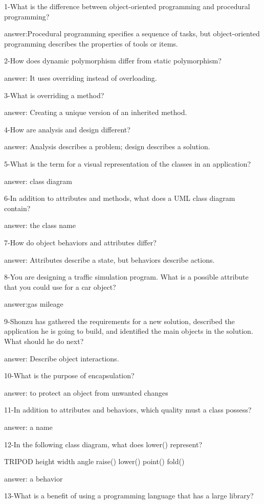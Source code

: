 1-What is the difference between object-oriented programming and procedural programming?


answer:Procedural programming specifies a sequence of tasks, but object-oriented programming describes the properties of tools or items.
 
2-How does dynamic polymorphism differ from static polymorphism?


answer: It uses overriding instead of overloading.

3-What is overriding a method?


answer: Creating a unique version of an inherited method.

4-How are analysis and design different?


answer: Analysis describes a problem; design describes a solution.

5-What is the term for a visual representation of the classes in an application?


answer: class diagram

6-In addition to attributes and methods, what does a UML class diagram contain?


answer: the class name

7-How do object behaviors and attributes differ?


answer: Attributes describe a state, but behaviors describe actions.

8-You are designing a traffic simulation program. What is a possible attribute that you could use for a car object?


answer:gas mileage

9-Shonzu has gathered the requirements for a new solution, described the application he is going to build, and identified the main objects in the solution. What should he do next?


answer: Describe object interactions.

10-What is the purpose of encapsulation?


answer: to protect an object from unwanted changes

11-In addition to attributes and behaviors, which quality must a class possess?


answer: a name

12-In the following class diagram, what does lower() represent?

TRIPOD
height
width
angle
raise()
lower()
point()
fold()


answer: a behavior

13-What is a benefit of using a programming language that has a large library?


